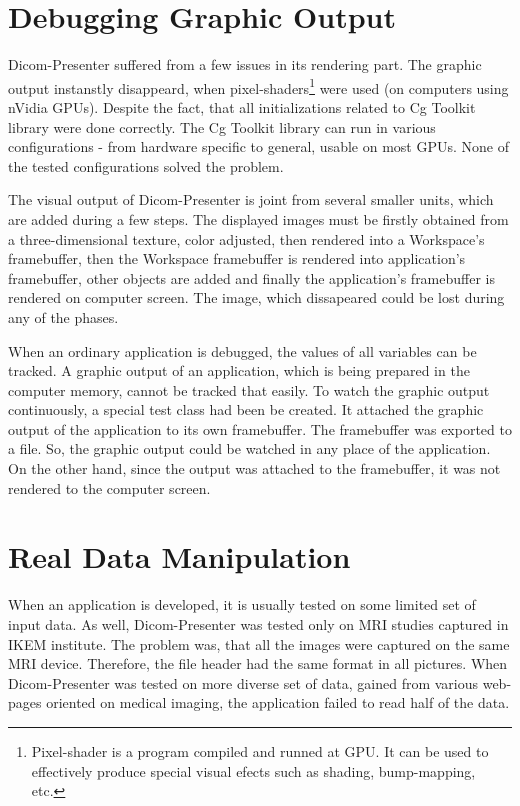 \section{Debugging Graphic Output}
Dicom-Presenter suffered from a few issues in its rendering part. The graphic output instanstly disappeard, when pixel-shaders\footnote{Pixel-shader is a program compiled and runned at GPU. It can be used to effectively produce special visual efects such as shading, bump-mapping, etc.} were used (on computers using nVidia GPUs). Despite the fact, that all initializations related to Cg Toolkit library were done correctly. The Cg Toolkit library can run in various configurations - from hardware specific to general, usable on most GPUs. None of the tested configurations solved the problem.

The visual output of Dicom-Presenter is joint from several smaller units, which are added during a few steps. The displayed images must be firstly obtained from a three-dimensional texture, color adjusted, then rendered into a Workspace's framebuffer, then the Workspace framebuffer is rendered into application's framebuffer, other objects are added and finally the application's framebuffer is rendered on computer screen. The image, which dissapeared could be lost during any of the phases.

When an ordinary application is debugged, the values of all variables can be tracked. A graphic output of an application, which is being prepared in the computer memory, cannot be tracked that easily. To watch the graphic output continuously, a special test class had been be created. It attached the graphic output of the application to its own framebuffer. The framebuffer was exported to a file. So, the graphic output could be watched in any place of the application. On the other hand, since the output was attached to the framebuffer, it was not rendered to the computer screen.

\section{Real Data Manipulation}
When an application is developed, it is usually tested on some limited set of input data. As well, Dicom-Presenter was tested only on MRI studies captured in IKEM institute. The problem was, that all the images were captured on the same MRI device. Therefore, the file header had the same format in all pictures. When Dicom-Presenter was tested on more diverse set of data, gained from various web-pages oriented on medical imaging, the application failed to read half of the data.

